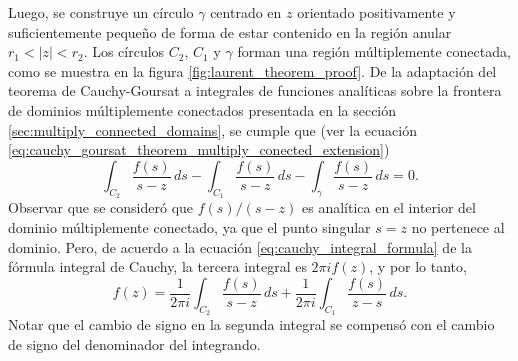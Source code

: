 \documentclass[a4paper]{report}
\begin{document}
Luego, se construye un círculo \(\gamma\) centrado en \(z\) orientado positivamente y suficientemente pequeño de forma de estar contenido en la región anular \(r_1<|z|<r_2\). Los círculos \(C_2\), \(C_1\) y \(\gamma\) forman una región múltiplemente conectada, como se muestra en la figura \ref{fig:laurent_theorem_proof}. De la adaptación del teorema de Cauchy-Goursat a integrales de funciones analíticas sobre la frontera de dominios múltiplemente conectados presentada en la sección \ref{sec:multiply_connected_domains}, se cumple que (ver la ecuación \ref{eq:cauchy_goursat_theorem_multiply_conected_extension})
\[
 \int_{C_2}\frac{f(s)}{s-z}\,ds-\int_{C_1}\frac{f(s)}{s-z}\,ds-\int_{\gamma}\frac{f(s)}{s-z}\,ds=0.
\]
Observar que se consideró que \(f(s)/(s-z)\) es analítica en el interior del dominio múltiplemente conectado, ya que el punto singular \(s=z\) no pertenece al dominio. Pero, de acuerdo a la ecuación \ref{eq:cauchy_integral_formula} de la fórmula integral de Cauchy, la tercera integral es \(2\pi if(z)\), y por lo tanto,
\begin{equation}\label{eq:laurent_theorem_proof_tmp2}
 f(z)=\frac{1}{2\pi i}\int_{C_2}\frac{f(s)}{s-z}\,ds+\frac{1}{2\pi i}\int_{C_1}\frac{f(s)}{z-s}\,ds. 
\end{equation}
Notar que el cambio de signo en la segunda integral se compensó con el cambio de signo del denominador del integrando.
\end{document}
